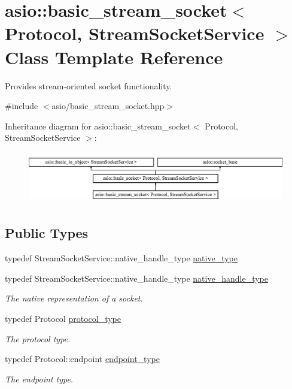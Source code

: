 \hypertarget{classasio_1_1basic__stream__socket}{}\section{asio\+:\+:basic\+\_\+stream\+\_\+socket$<$ Protocol, Stream\+Socket\+Service $>$ Class Template Reference}
\label{classasio_1_1basic__stream__socket}


Provides stream-\/oriented socket functionality.  




{\ttfamily \#include $<$asio/basic\+\_\+stream\+\_\+socket.\+hpp$>$}

Inheritance diagram for asio\+:\+:basic\+\_\+stream\+\_\+socket$<$ Protocol, Stream\+Socket\+Service $>$\+:\begin{figure}[H]
\begin{center}
\leavevmode
\includegraphics[height=2.288828cm]{classasio_1_1basic__stream__socket}
\end{center}
\end{figure}
\subsection*{Public Types}
\begin{DoxyCompactItemize}
\item 
typedef Stream\+Socket\+Service\+::native\+\_\+handle\+\_\+type \hyperlink{classasio_1_1basic__stream__socket_a0e1052ee023a793196175697720dcce2}{native\+\_\+type}
\item 
typedef Stream\+Socket\+Service\+::native\+\_\+handle\+\_\+type \hyperlink{classasio_1_1basic__stream__socket_a3afcab378b90959f1779a74b25e4ad1e}{native\+\_\+handle\+\_\+type}
\begin{DoxyCompactList}\small\item\em The native representation of a socket. \end{DoxyCompactList}\item 
typedef Protocol \hyperlink{classasio_1_1basic__stream__socket_a50b36dfd32d1cca507415b41ab7274d9}{protocol\+\_\+type}
\begin{DoxyCompactList}\small\item\em The protocol type. \end{DoxyCompactList}\item 
typedef Protocol\+::endpoint \hyperlink{classasio_1_1basic__stream__socket_a910d3f9ffa82f284f3fccbecb2f2d3fb}{endpoint\+\_\+type}
\begin{DoxyCompactList}\small\item\em The endpoint type. \end{DoxyCompactList}\end{DoxyCompactItemize}
